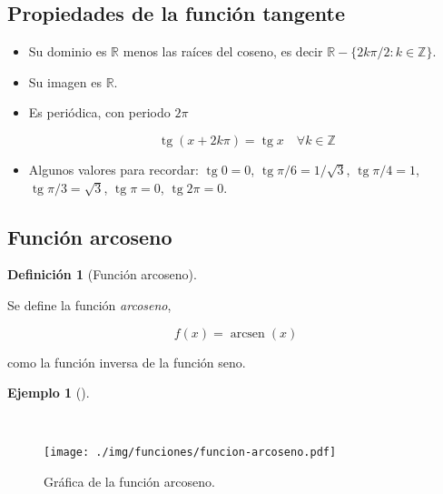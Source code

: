 \documentclass[
  a4paper,
]{scrreport}
\theoremstyle{definition}
\theoremstyle{definition}
\newtheorem{example}{Ejemplo}[chapter]
\theoremstyle{definition}
\newtheorem{definition}{Definición}[chapter]
\theoremstyle{plain}
\theoremstyle{plain}
\theoremstyle{plain}
\theoremstyle{remark}
\begin{document}
\subsection{Propiedades de la función
tangente}\label{propiedades-de-la-funciuxf3n-tangente}

\begin{itemize}
\item
  Su dominio es \(\mathbb{R}\) menos las raíces del coseno, es decir
  \(\mathbb{R}-\{2k\pi/2: k\in \mathbb{Z}\}\).
\item
  Su imagen es \(\mathbb{R}\).
\item
  Es periódica, con periodo \(2\pi\)

  \[\operatorname{tg} (x+2k\pi)= \operatorname{tg} x\quad \forall k\in \mathbb{Z}\]
\item
  Algunos valores para recordar: \(\operatorname{tg} 0=0\),
  \(\operatorname{tg} \pi/6= 1/\sqrt{3}\),
  \(\operatorname{tg} \pi/4=1\), \(\operatorname{tg} \pi/3= \sqrt{3}\),
  \(\operatorname{tg} \pi =0\), \(\operatorname{tg} 2\pi=0\).
\end{itemize}

\subsection{Función arcoseno}\label{funciuxf3n-arcoseno}

\begin{definition}[Función
arcoseno]\protect\hypertarget{def-funcion-arcoseno}{}\label{def-funcion-arcoseno}

Se define la función \emph{arcoseno},

\[f(x)=\operatorname{arcsen}(x)\]

como la función inversa de la función seno.

\end{definition}

\begin{example}[]\protect\hypertarget{exm-funcion-arcoseno}{}\label{exm-funcion-arcoseno}

~

\begin{figure}[H]

{\centering \texttt{[image: ./img/funciones/funcion-arcoseno.pdf]}

}

\caption{Gráfica de la función arcoseno.}

\end{figure}%

\end{example}
\end{document}
